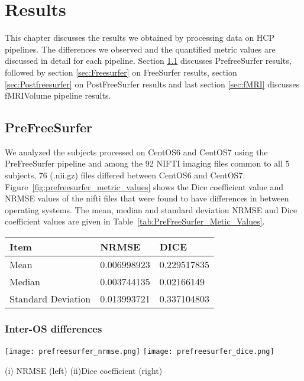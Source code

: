 \chapter{Results}
This chapter discusses the results we obtained by processing data on HCP pipelines. The differences we observed and the quantified metric values are discussed in detail for each pipeline. Section \ref{sec:Prefreesurfer} discusses PrefreeSurfer results, followed by section \ref{sec:Freesurfer} on FreeSurfer results, section \ref{sec:Postfreesurfer} on PostFreeSurfer results and last section \ref{sec:fMRI} discusses fMRIVolume pipeline results.

\section{PreFreeSurfer} \label{sec:Prefreesurfer}
We analyzed the subjects processed on CentOS6 and CentOS7 using the PreFreeSurfer pipeline and among the 92 NIFTI imaging files common to all 5 subjects, 76 (.nii.gz) files differed between CentOS6 and CentOS7. Figure~\ref{fig:prefreesurfer_metric_values} shows the Dice coefficient value and NRMSE values of the nifti files that were found to have differences in between operating systems. The mean, median and standard deviation NRMSE and Dice coefficient values are given in Table~\ref{tab:PreFreeSurfer_Metic_Values}.

\begin{center}
\begin{tabular}{|l|l|l|}
\hline
Item               & NRMSE       & DICE        \\ \hline
Mean               & 0.006998923 & 0.229517835 \\ \hline
Median             & 0.003744135 & 0.02166149  \\ \hline
Standard Deviation & 0.013993721 & 0.337104803 \\ \hline
\end{tabular}
\label{tab:PreFreeSurfer_Metic_Values}
\end{center}

\subsection{Inter-OS differences}

\begin{center}
\texttt{[image: prefreesurfer\_nrmse.png]}%
\texttt{[image: prefreesurfer\_dice.png]}
\caption*{(i) NRMSE (left) (ii)Dice coefficient (right)}
\label{fig:prefreesurfer_metric_values}
\end{center}

